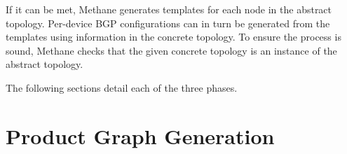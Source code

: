 \documentclass[numbers, 10pt, preprint]{sigplanconf}
\newcommand{\sysname}{{\small \sf Methane}\xspace}
\begin{document}
If it can be met, \sysname generates templates for each node in the abstract topology.  Per-device BGP configurations can in turn be generated from the templates
using information in the concrete topology. To ensure the process is sound,
\sysname checks that the given concrete topology is an instance of the abstract topology.

The following sections detail each of the three phases.

%
%
%


%
%
%
%

\section{Product Graph Generation}
\label{sec:language}



\end{document}
